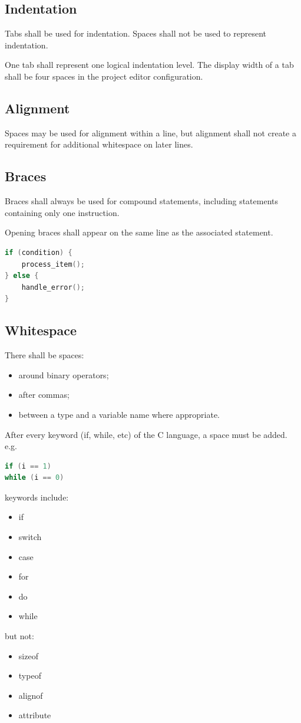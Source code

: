 \subsection{Indentation}

Tabs shall be used for indentation. Spaces shall not be used to represent indentation.

One tab shall represent one logical indentation level. The display width of a tab shall be four spaces in the project editor configuration.

\subsection{Alignment}

Spaces may be used for alignment within a line, but alignment shall not create a requirement for additional whitespace on later lines.

\subsection{Braces}

Braces shall always be used for compound statements, including statements containing only one instruction.

Opening braces shall appear on the same line as the associated statement.

\begin{lstlisting}[language=C]
if (condition) {
	process_item();
} else {
	handle_error();
}
\end{lstlisting}

\subsection{Whitespace}

There shall be spaces:

\begin{itemize}
	\item around binary operators;
	\item after commas;
	\item between a type and a variable name where appropriate.
\end{itemize}

After every keyword (if, while, etc) of the C language, a space must be added. e.g.
\begin{lstlisting}[language=C]
if (i == 1)
while (i == 0)
\end{lstlisting}
keywords include:
\begin{itemize}
	\item if
	\item switch
	\item case
	\item for
	\item do
	\item while
\end{itemize}
but not:
\begin{itemize}
	\item sizeof
	\item typeof
	\item alignof
	\item attribute
\end{itemize}

